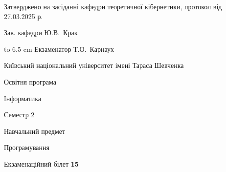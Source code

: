 \documentclass[12pt, ukrainian]{article}
\begin{document}
{\smallskip\smallskip \begin {scriptsize} Затверджено на засіданні кафедри теоретичної кібернетики, протокол   від   27.03.2025 р.\par\smallskip\smallskip\smallskip\smallskip
{\parbox {6.5 cm} {Зав. кафедри \dotfill Ю.В.~Крак}}\hspace {0.7cm} {\hbox to 6.5 cm { Екзаменатор \dotfill Т.О.~Карнаух}} \end{scriptsize}}
\newpage
{{\begin {scriptsize}\par
{ \center  Київський національний університет імені Тараса Шевченка \par}
{\parbox {5 cm}{Освітня програма \hfill}{\parbox {7 cm}{Інформатика\hfill}}\parbox {6 cm}{\hfill Семестр 2}}\par
{\parbox {5 cm} {Навчальний предмет \hfill}\parbox {7 cm}{Програмування \hfill}\parbox {6cm}{\hfill}\par}\vspace{-15pt} \end{scriptsize}}{\center Екзаменаційний білет \No \textbf { 15 }\par}}
\end{document}
